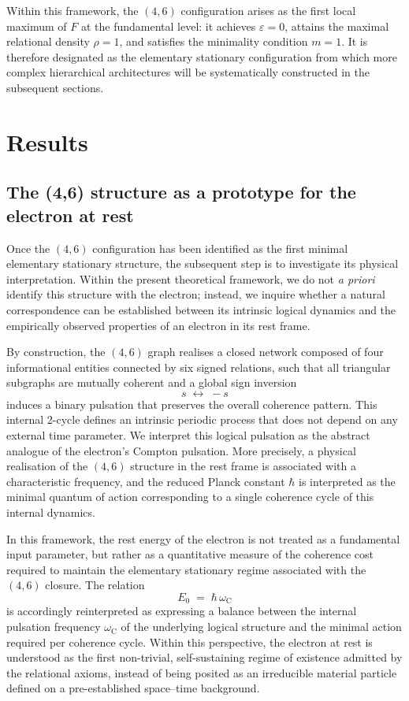 \documentclass[11pt,a4paper]{article}
\begin{document}
Within this framework, the \((4,6)\) configuration arises as the first local maximum of \(F\) at the fundamental level: it achieves \(\varepsilon = 0\), attains the maximal relational density \(\rho = 1\), and satisfies the minimality condition \(m = 1\). It is therefore designated as the elementary stationary configuration from which more complex hierarchical architectures will be systematically constructed in the subsequent sections.

\section{Results}

\subsection{The (4,6) structure as a prototype for the electron at rest}

Once the \((4,6)\) configuration has been identified as the first minimal elementary stationary structure, the subsequent step is to investigate its physical interpretation. Within the present theoretical framework, we do not \emph{a priori} identify this structure with the electron; instead, we inquire whether a natural correspondence can be established between its intrinsic logical dynamics and the empirically observed properties of an electron in its rest frame.

By construction, the \((4,6)\) graph realises a closed network composed of four informational entities connected by six signed relations, such that all triangular subgraphs are mutually coherent and a global sign inversion
\[
  s \;\longleftrightarrow\; -s
\]
induces a binary pulsation that preserves the overall coherence pattern. This internal 2-cycle defines an intrinsic periodic process that does not depend on any external time parameter. We interpret this logical pulsation as the abstract analogue of the electron’s Compton pulsation. More precisely, a physical realisation of the \((4,6)\) structure in the rest frame is associated with a characteristic frequency, and the reduced Planck constant \(\hbar\) is interpreted as the minimal quantum of action corresponding to a single coherence cycle of this internal dynamics.

In this framework, the rest energy of the electron is not treated as a fundamental input parameter, but rather as a quantitative measure of the coherence cost required to maintain the elementary stationary regime associated with the \((4,6)\) closure. The relation
\[
  E_0 \;=\; \hbar \,\omega_{\mathrm{C}}
\]
is accordingly reinterpreted as expressing a balance between the internal pulsation frequency \(\omega_{\mathrm{C}}\) of the underlying logical structure and the minimal action required per coherence cycle. Within this perspective, the electron at rest is understood as the first non-trivial, self-sustaining regime of existence admitted by the relational axioms, instead of being posited as an irreducible material particle defined on a pre-established space–time background.
\end{document}
